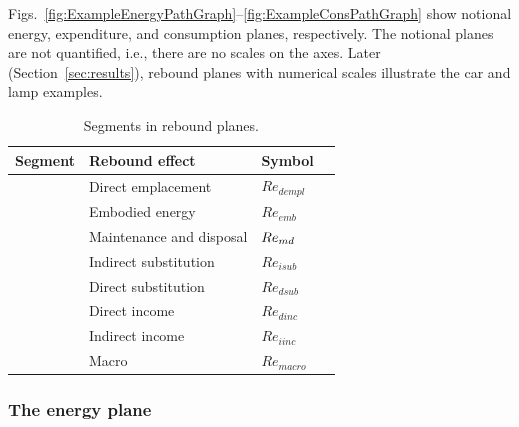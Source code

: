 \documentclass[12pt]{article}\usepackage[]{graphicx}\usepackage[]{xcolor}
\begin{document}
Figs.~\ref{fig:ExampleEnergyPathGraph}--\ref{fig:ExampleConsPathGraph} show
notional energy, expenditure, and consumption planes,
respectively.
The notional planes are not quantified, i.e., there are no scales on the axes.
Later (Section~\ref{sec:results}), 
rebound planes with numerical scales illustrate the car and lamp examples.

\begin{table}
\centering %
\caption{Segments in rebound planes.} 
\begin{tabular}{r l l c}
  \toprule
  \multicolumn{1}{c}{Segment} & Rebound effect            & Symbol           \\
  \midrule
  \circa{} \hspace{52.0mm}    & Direct emplacement        & $Re_{dempl}$     \\
  \ab{}    \hspace{45.0mm}    & Embodied energy           & $Re_{emb}$       \\
  \bstar{} \hspace{37.8mm}    & Maintenance and disposal  & $Re_{md}$       \\
  \midrule
  \starc{} \hspace{30.9mm}    & Indirect substitution     & $Re_{isub}$      \\ 
  \chat{}  \hspace{23.2mm}    & Direct substitution       & $Re_{dsub}$      \\ 
  \midrule
  \hatd{}  \hspace{16.0mm}    & Direct income             & $Re_{dinc}$      \\ 
  \dbar{}  \hspace{ 7.7mm}    & Indirect income           & $Re_{iinc}$      \\ 
  \midrule
  \bartilde{}                 & Macro                     & $Re_{macro}$     \\
  \bottomrule
\end{tabular}
\label{tab:path_graph_segments}
\end{table}


\subsubsection{The energy plane}
\label{sec:energy_path_graphs}
\end{document}
